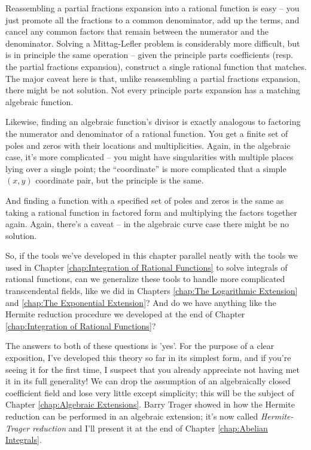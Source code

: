 Reassembling a partial fractions expansion into a rational function is
easy -- you just promote all the fractions to a common denominator,
add up the terms, and cancel any common factors that remain between
the numerator and the denominator.  Solving a Mittag-Lefler problem is
considerably more difficult, but is in principle the same operation --
given the principle parts coefficients (resp. the partial fractions
expansion), construct a single rational function that matches.  The
major caveat here is that, unlike reassembling a partial fractions
expansion, there might be not solution.  Not every principle parts
expansion has a matching algebraic function.

Likewise, finding an algebraic function's divisor is exactly analogous
to factoring the numerator and denominator of a rational function.
You get a finite set of poles and zeros with their locations and
multiplicities.  Again, in the algebraic case, it's more complicated --
you might have singularities with multiple places lying over a single
point; the ``coordinate'' is more complicated that a simple $(x,y)$
coordinate pair, but the principle is the same.

And finding a function with a specified set of poles and zeros is the
same as taking a rational function in factored form and multiplying
the factors together again.  Again, there's a caveat -- in the
algebraic curve case there might be no solution.

So, if the tools we've developed in this chapter parallel neatly with
the tools we used in Chapter \ref{chap:Integration of Rational Functions} to solve integrals of rational
functions, can we generalize these tools to handle more complicated
transcendental fields, like we did in Chapters \ref{chap:The Logarithmic Extension} and \ref{chap:The Exponential Extension}?
And do we have anything like the Hermite reduction procedure we developed at the
end of Chapter \ref{chap:Integration of Rational Functions}?

The answers to both of these questions is 'yes'.  For the purpose of a
clear exposition, I've developed this theory so far in its simplest
form, and if you're seeing it for the first time, I suspect that you
already appreciate not having met it in its full generality!  We can
drop the assumption of an algebraically closed coefficient field and
lose very little except simplicity; this will be the subject of
Chapter \ref{chap:Algebraic Extensions}.  Barry Trager showed in \cite{trager} how the Hermite
reduction can be performed in an algebraic extension; it's now called
{\it Hermite-Trager reduction} and I'll present it at the end of
Chapter \ref{chap:Abelian Integrals}.

